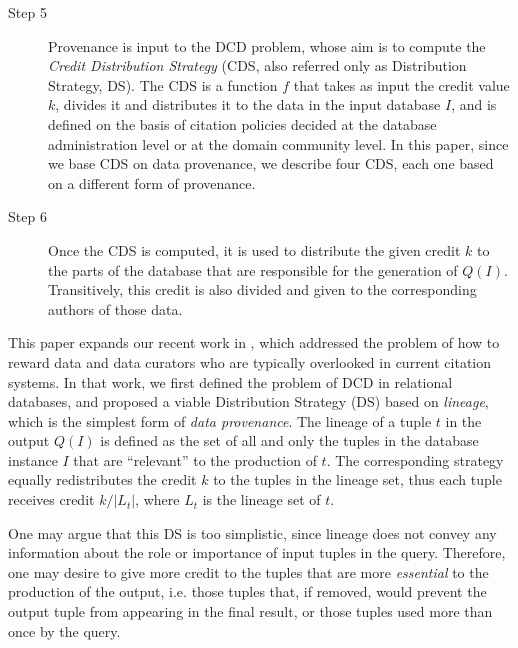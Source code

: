 \begin{description}
	\item[Step 5] Provenance is input to the DCD problem, whose aim is to compute the \emph{Credit Distribution Strategy} (CDS, also referred only as Distribution Strategy, DS). The CDS is a function $f$ that takes as input the credit value $k $, divides it and distributes it to the data in the input database $I$, and is defined on the basis of citation policies decided at the database administration level or at the domain community level. 
	In this paper, since we base CDS on data provenance, we describe four CDS, each one based on a different form of provenance. 
	\item[Step 6] Once the CDS is computed, it is used to distribute the given credit $k$ to the parts of the database that are responsible for the generation of $Q(I)$. Transitively, this credit is also divided and given to the corresponding authors of those data.
\end{description}

\vspace{0.15in}

This paper expands our recent work in \citep{dosso2020data}, which addressed the problem of how to reward data and data curators who are typically overlooked in current citation systems.
In that work, we first defined the problem of DCD in relational databases, and proposed a viable Distribution Strategy (DS) based on \emph{lineage}, which is the simplest form of \emph{data provenance}.
The lineage of a tuple $t$ in the output $Q(I)$ is defined as the set of all and only the tuples in the database instance $I$ that are ``relevant'' to the production of $t$.
The corresponding strategy equally redistributes the credit $k$ to the tuples in the lineage set, thus each tuple receives credit $k/|L_t|$, where $L_t$ is the lineage set of $t$. 

One may argue that this DS is too simplistic, since lineage 
does not convey any information about the role or importance of input tuples in the query.
Therefore, one may desire to give more credit to the tuples that are more {\em essential} to the production of the output, i.e. those tuples that, if removed, would prevent the output tuple from appearing in the final result, or those tuples used more than once  by the query. 

